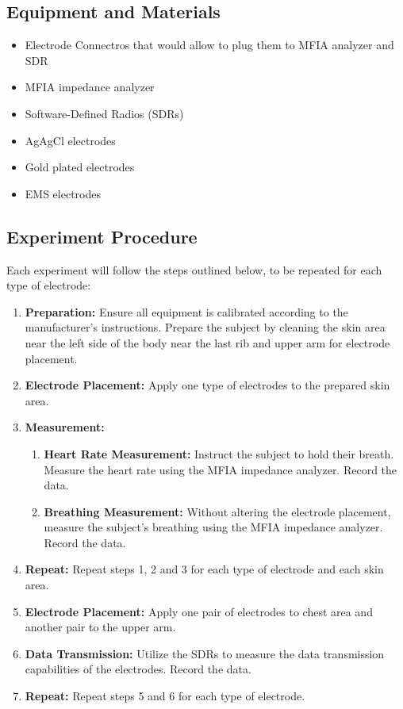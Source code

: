 \documentclass[conference]{IEEEtran}
\begin{document}
\subsection{Equipment and Materials}
\begin{itemize}
    \item Electrode Connectros that would allow to plug them to MFIA analyzer and SDR
    \item MFIA impedance analyzer
    \item Software-Defined Radios (SDRs)
    \item AgAgCl electrodes
    \item Gold plated electrodes
    \item EMS electrodes
\end{itemize}

\subsection{Experiment Procedure}
Each experiment will follow the steps outlined below, to be repeated for each type of electrode:

\begin{enumerate}
    \item \textbf{Preparation:} Ensure all equipment is calibrated according to the manufacturer's instructions. Prepare the subject by cleaning the skin area near the left side of the body near the last rib and upper arm for electrode placement.
    \item \textbf{Electrode Placement:} Apply one type of electrodes to the prepared skin area.
    \item \textbf{Measurement:}
    \begin{enumerate}
        \item \textbf{Heart Rate Measurement:} Instruct the subject to hold their breath. Measure the heart rate using the MFIA impedance analyzer. Record the data.
        \item \textbf{Breathing Measurement:} Without altering the electrode placement, measure the subject's breathing using the MFIA impedance analyzer. Record the data.
        
    \end{enumerate}

    \item \textbf{Repeat:} Repeat steps 1, 2 and 3 for each type of electrode and each skin area.
    \item \textbf{Electrode Placement:} Apply one pair of electrodes to chest area and another pair to the upper arm.
    \item \textbf{Data Transmission:} Utilize the SDRs to measure the data transmission capabilities of the electrodes. Record the data.
    \item \textbf{Repeat:} Repeat steps 5 and 6 for each type of electrode.
\end{enumerate}
\end{document}
